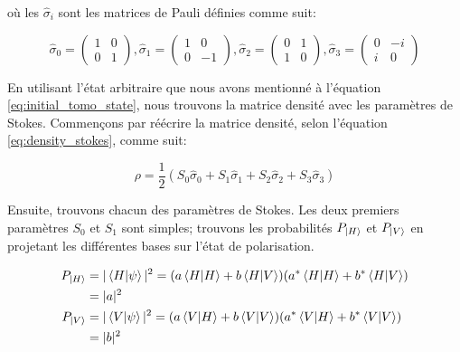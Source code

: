 \begin{onehalfspace}
    \noindent où les $\hat{\sigma}_i$ sont les matrices de Pauli définies 
    comme suit:
    
    \begin{equation}
        \hat{\sigma}_0 = \begin{pmatrix}
            1 & 0\\
            0 & 1
        \end{pmatrix},
        \hat{\sigma}_1 = \begin{pmatrix}
            1 & 0\\
            0 & -1
        \end{pmatrix},
        \hat{\sigma}_2 = \begin{pmatrix}
            0 & 1\\
            1 & 0
        \end{pmatrix},
        \hat{\sigma}_3 = \begin{pmatrix}
            0 & -i\\
            i & 0
        \end{pmatrix}
    \end{equation}

    \noindent En utilisant l'état arbitraire que nous avons mentionné
    à l'équation \ref{eq:initial_tomo_state},  nous
    trouvons la matrice densité avec les paramètres de Stokes. 
    Commençons par réécrire la matrice densité, selon l'équation \ref{eq:density_stokes}, comme suit:

    \begin{equation}
        \rho = \frac{1}{2}(S_0\hat{\sigma}_0 + S_1\hat{\sigma}_1 + S_2\hat{\sigma}_2 + S_3\hat{\sigma}_3)
    \end{equation}

    \noindent Ensuite, trouvons chacun des paramètres de Stokes.
    Les deux premiers paramètres $S_0$ et $S_1$ sont simples;
    trouvons les probabilités $P_{\ket{H}}$ et $P_{\ket{V}}$
    en projetant les différentes bases sur l'état de polarisation.

    \begin{align}
        P_{\ket{H}} &= |\bra{H}\ket{\psi}|^2 = (a\bra{H}\ket{H} + b\bra{H}\ket{V})(a^*\bra{H}\ket{H} + b^*\bra{H}\ket{V})\\
        &= |a|^2\\
        P_{\ket{V}} &= |\bra{V}\ket{\psi}|^2 = (a\bra{V}\ket{H} + b\bra{V}\ket{V})(a^*\bra{V}\ket{H} + b^*\bra{V}\ket{V})\\
        &= |b|^2
    \end{align}


\end{onehalfspace}
